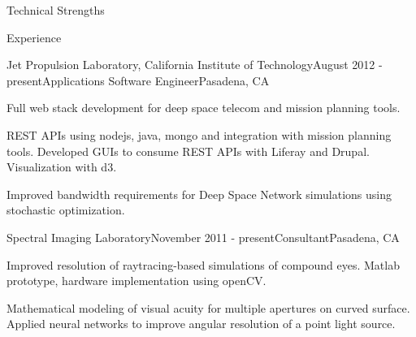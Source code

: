 \documentclass{resume} %
\begin{document}

\begin{rSection}{Technical Strengths}


\end{rSection}


\begin{rSection}{Experience}

\begin{rSubsection}{Jet Propulsion Laboratory, California Institute of Technology}{August 2012 - present}{Applications Software Engineer}{Pasadena, CA}
\item Full web stack development for deep space telecom and mission planning tools. 
\item REST APIs using nodejs, java, mongo and integration with mission planning tools. Developed GUIs to consume REST APIs with Liferay and Drupal. Visualization with d3.
\item Improved bandwidth requirements for Deep Space Network simulations using stochastic optimization.

\end{rSubsection}


\begin{rSubsection}{Spectral Imaging Laboratory}{November 2011 - present}{Consultant}{Pasadena, CA}
\item Improved resolution of raytracing-based simulations of compound eyes. Matlab prototype, hardware implementation using openCV.
\item Mathematical modeling of visual acuity for multiple apertures on curved surface. Applied neural networks to improve angular resolution of a point light source. 
\end{rSubsection}



\end{rSection}
\end{document}
